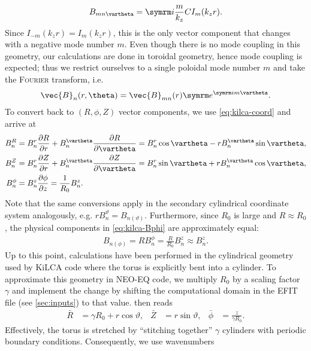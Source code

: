 \begin{gather}
  B_{m n \vartheta} = \im \frac{m}{k_{z}} C I_m(k_{z} r). \label{eq:kilca-Btheta}
\end{gather}
Since $I_{-m}(k_{z} r) = I_{m} (k_{z} r)$, this is the only vector component that changes with a negative mode number $m$. Even though there is no mode coupling in this geometry, our calculations are done in toroidal geometry, hence mode coupling is expected; thus we restrict ourselves to a single poloidal mode number $m$ and take the \textsc{Fourier} transform, i.e.
\begin{gather}
  \vec{B}_{n} (r, \theta) = \vec{B}_{m n} (r) \e^{\im m \vartheta}.
\end{gather}
To convert back to $(R, \phi, Z)$ vector components, we use \cref{eq:kilca-coord} and arrive at
\begin{align}
  B_{n}^{R} &= B_{n}^{r} \pd[R]{r} + B_{n}^{\vartheta} \pd[R]{\vartheta} = B_{n}^{r} \cos \vartheta - r B_{n}^{\vartheta} \sin \vartheta, \label{eq:kilca-BR} \\
  B_{n}^{Z} &= B_{n}^{r} \pd[Z]{r} + B_{n}^{\vartheta} \pd[Z]{\vartheta} = B_{n}^{r} \sin \vartheta + r B_{n}^{\vartheta} \cos \vartheta, \label{eq:kilca-BZ} \\
  B_{n}^{\phi} &= B_{n}^{z} \pd[\phi]{z} = \frac{1}{R_{0}} B_{n}^{z}. \label{eq:kilca-Bphi}
\end{align}
Note that the same conversions apply in the secondary cylindrical coordinate system analogously, e.g. $r B_{n}^{\vartheta} = B_{n (\vartheta)}$. Furthermore, since $R_{0}$ is large and $R \approx R_{0}$, the physical components in \cref{eq:kilca-Bphi} are approximately equal:
\begin{gather}
  B_{n (\phi)} = R B_{n}^{\phi} = \frac{R}{R_{0}} B_{n}^{z} \approx B_{n}^{z}.
\end{gather}
Up to this point, calculations have been performed in the cylindrical geometry used by KiLCA code where the torus is explicitly bent into a cylinder. To approximate this geometry in NEO-EQ code, we multiply $R_0$ by a scaling factor $\gamma$ and implement the change by shifting the computational domain in the EFIT file (see \cref{sec:inputs}) to that value.  then reads
\begin{align}
  \bar{R} &= \gamma R_{0} + r \cos \vartheta, & \bar{Z} &= r \sin \vartheta, & \bar{\phi} &= \frac{z}{\gamma R_0}. \label{eq:kilca-coord-scaled}
\end{align}
Effectively, the torus is stretched by \enquote{stitching together} $\gamma$ cylinders with periodic boundary conditions. Consequently, we use wavenumbers
